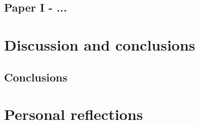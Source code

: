 \documentclass[electronic]{kthesis}
\begin{document}
	\section{Paper I - ...}
	
	\chapter{Discussion and conclusions}
	\label{Conclusions}
	\noindent \lipsum[1]
	
	\section{Conclusions}
	\noindent \lipsum[1]
	
	\chapter{Personal reflections}
	\label{PersonalReflections}
	\noindent \lipsum[1]
	
	
	\renewcommand{\bibname}{References}%
	
	
\end{document}
